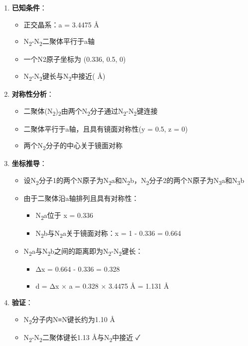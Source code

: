 \begin{enumerate}
\def\labelenumi{\arabic{enumi}.}
\tightlist
\item
  \textbf{已知条件}：

  \begin{itemize}
  \tightlist
  \item
    正交晶系：a = 3.4475 Å
  \item
    N\textsubscript{2}-N\textsubscript{2}二聚体平行于a轴
  \item
    一个N2原子坐标为 (0.336, 0.5, 0)
  \item
    N\textsubscript{2}-N\textsubscript{2}键长与N\textsubscript{2}中接近( Å)
  \end{itemize}
\item
  \textbf{对称性分析}：

  \begin{itemize}
  \tightlist
  \item
    二聚体(N\textsubscript{2})\textsubscript{2}由两个N\textsubscript{2}分子通过N\textsubscript{2}-N\textsubscript{2}键连接
  \item
    二聚体平行于a轴，且具有镜面对称性(y = 0.5, z = 0)
  \item
    两个N\textsubscript{2}分子的中心关于镜面对称
  \end{itemize}
\item
  \textbf{坐标推导}：

  \begin{itemize}
  \tightlist
  \item
    设N\textsubscript{2}分子1的两个N原子为N\textsubscript{2}a和N\textsubscript{2}b，N\textsubscript{2}分子2的两个N原子为N\textsubscript{3}a和N\textsubscript{3}b
  \item
    由于二聚体沿a轴排列且具有对称性：

    \begin{itemize}
    \tightlist
    \item
      N\textsubscript{2}a位于 x = 0.336
    \item
      N\textsubscript{2}b与N\textsubscript{2}a关于镜面对称：x = 1 - 0.336 = 0.664
    \end{itemize}
  \item
    N\textsubscript{2}a与N\textsubscript{2}b之间的距离即为N\textsubscript{2}-N\textsubscript{2}键长：

    \begin{itemize}
    \tightlist
    \item
      Δx = 0.664 - 0.336 = 0.328
    \item
      d = Δx × a = 0.328 × 3.4475 Å = 1.131 Å
    \end{itemize}
  \end{itemize}
\item
  \textbf{验证}：

  \begin{itemize}
  \tightlist
  \item
    N\textsubscript{2}分子内N≡N键长约为1.10 Å
  \item
    N\textsubscript{2}-N\textsubscript{2}二聚体键长1.13 Å与N\textsubscript{2}中接近 ✓
  \end{itemize}
\end{enumerate}

